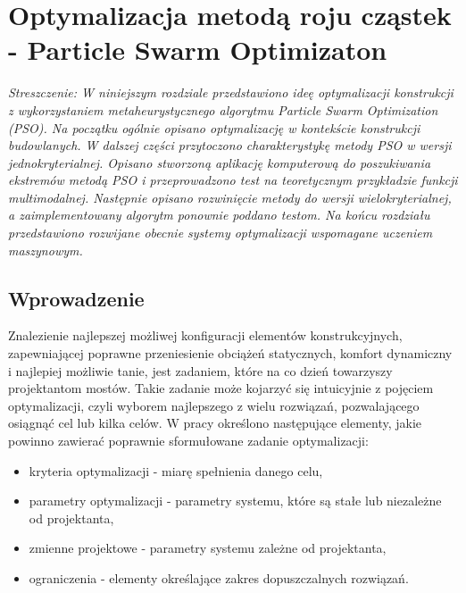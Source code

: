 \chapter{Optymalizacja metodą roju cząstek - Particle Swarm Optimizaton} \label{sect:PSO_chapter}

\textit{Streszczenie: W niniejszym rozdziale przedstawiono ideę optymalizacji konstrukcji z wykorzystaniem metaheurystycznego algorytmu Particle Swarm Optimization (PSO). Na początku ogólnie opisano optymalizację w kontekście konstrukcji budowlanych. W dalszej części przytoczono charakterystykę metody PSO w wersji jednokryterialnej. Opisano stworzoną aplikację komputerową do poszukiwania ekstremów metodą PSO i przeprowadzono test na teoretycznym przykładzie funkcji multimodalnej. Następnie opisano rozwinięcie metody do wersji wielokryterialnej, a zaimplementowany algorytm ponownie poddano testom. Na końcu rozdziału przedstawiono rozwijane obecnie systemy optymalizacji wspomagane uczeniem maszynowym.}

\section*{Wprowadzenie}
Znalezienie najlepszej możliwej konfiguracji elementów konstrukcyjnych, zapewniającej poprawne przeniesienie obciążeń statycznych, komfort dynamiczny i najlepiej możliwie tanie, jest zadaniem, które na co dzień towarzyszy projektantom mostów. Takie zadanie może kojarzyć się intuicyjnie z pojęciem optymalizacji, czyli wyborem najlepszego z wielu rozwiązań, pozwalającego osiągnąć cel lub kilka celów. W pracy \cite{Szymczak1995} określono następujące elementy, jakie powinno zawierać poprawnie sformułowane zadanie optymalizacji:
\begin{itemize}
	\item kryteria optymalizacji - miarę spełnienia danego celu,
	\item parametry optymalizacji - parametry systemu, które są stałe lub niezależne od projektanta, 
	\item zmienne projektowe - parametry systemu zależne od projektanta,
	\item ograniczenia - elementy określające zakres dopuszczalnych rozwiązań. 
\end{itemize}

